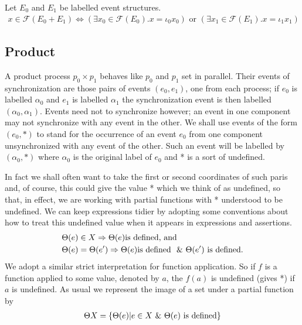 \documentclass{article}
\begin{document}
\begin{proposition}
    
Let $E_0$ and $E_1$ be labelled event structures.
\begin{align*}
    x \in \mathcal{F}(E_0+E_1) \iff (\exists x_0 \in \mathcal{F}(E_0).x=\iota_0x_0)
    \text{ or } (\exists x_1 \in \mathcal{F}(E_1).x=\iota_1x_1)
\end{align*}

\end{proposition}

\subsection{Product}

A product process $p_0 \times p_1$ behaves like $p_0$ and $p_1$ set in parallel.
Their events of synchronization are those pairs of events $(e_0,e_1)$, one from each process;
if $e_0$ is labelled $\alpha_0$ and $e_1$ is labelled $\alpha_1$ the synchronization event is
then labelled $(\alpha_0,\alpha_1)$.
Events need not to synchronize however; an event in one component may not synchronize with
any event in the other.
We shall use events of the form $(e_0,*)$ to stand for the occurrence of an event $e_0$ 
from one component unsynchronized with any event of the other.
Such an event will be labelled by $(\alpha_0,*)$ where $\alpha_0$ is the original label of $e_0$
and * is a sort of undefined.

In fact we shall often want to take the first or second coordinates of such paris and,
of course, this could give the value * which we think of as undefined,
so that, in effect, we are working with partial functions with * understood to be undefined.
We can keep expressions tidier by adopting some conventions about how to treat this undefined value 
when it appears in expressions and assertions.
\begin{align*}
    & \Theta(e) \in X \Rightarrow \Theta(e) \text{is defined, and } \\
    & \Theta(e) = \Theta(e') \Rightarrow \Theta(e) \text{is defined } \ \& \  \Theta(e')\text{ is defined}. 
\end{align*}
We adopt a similar strict interpretation for function application.
So if $f$ is a function applied to some value, denoted by $a$, the $f(a)$ is undefined (gives *)
if $a$ is undefined.
As usual we represent the image of a set under a partial function by
\begin{align*}
    \Theta X = \{\Theta(e)|e \in X \ \& \  \Theta(e) \text{ is defined}\}
\end{align*}
\end{document}
